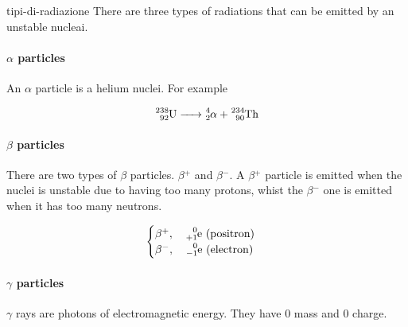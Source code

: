 \documentclass[preview]{standalone}
\begin{document}
\begin{snippet}{tipi-di-radiazione}
There are three types of radiations that can be emitted by an unstable nucleai.

\paragraph{\(\alpha\) particles}

An \(\alpha\) particle is a helium nuclei. For example

\[
    \ce{^238_92U -> ^4_2\alpha{} + ^234_90Th}
\]

\paragraph{\(\beta\) particles}

There are two types of \(\beta{}\) particles. \(\beta{}^+\) and \(\beta{}^-\).
A \(\beta{}^+\) particle is emitted when the nuclei is unstable due to
having too many protons, whist the \(\beta{}^-\) one is emitted when it has
too many neutrons.

\[
    \begin{cases}
        \beta{}^+,\quad \ce{^0_{+1}e} \text{ (positron)} \\
        \beta{}^-,\quad \ce{^0_{-1}e} \text{ (electron)}
    \end{cases}
\]

\paragraph{\(\gamma\) particles}

\(\gamma\) rays are photons of electromagnetic energy. They have \(0\) mass and \(0\) charge.
\end{snippet}


\end{document}

